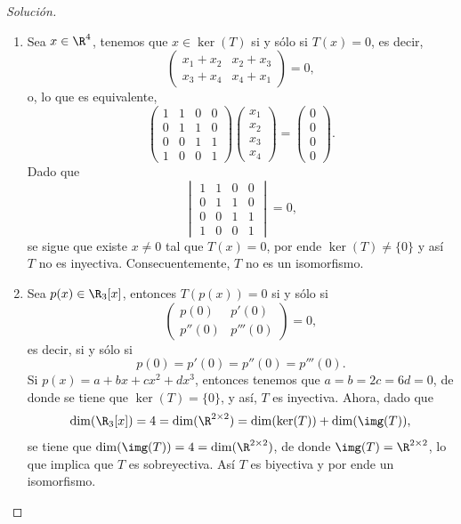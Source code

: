 \documentclass[a4,11pt]{aleph-notas}
\begin{document}
\begin{proof}[Solución]\hspace{0pt}
    \begin{enumerate}
        \item Sea $x\in\R^4$, tenemos que $x\in\ker(T)$ si y sólo si $T(x)=0$, es decir,
        \[
            \begin{pmatrix}
            x_1 + x_2 & x_2 + x_3\\
            x_3 + x_4 & x_4 + x_1
            \end{pmatrix} = 0,
        \]
        o, lo que es equivalente,
        \[
            \begin{pmatrix}
            1 & 1 & 0 & 0\\
            0 & 1 & 1 & 0\\
            0 & 0 & 1 & 1\\
            1 & 0 & 0 & 1 
            \end{pmatrix} \begin{pmatrix}
            x_1 \\ x_2 \\ x_3 \\ x_4
            \end{pmatrix} = \begin{pmatrix}
            0 \\ 0 \\ 0 \\ 0
            \end{pmatrix}.
        \]
        Dado que
        \[
            \begin{vmatrix}
            1 & 1 & 0 & 0\\
            0 & 1 & 1 & 0\\
            0 & 0 & 1 & 1\\
            1 & 0 & 0 & 1 
            \end{vmatrix} = 0,
        \]
        se sigue que existe $x\neq 0$ tal que $T(x) = 0$, por ende $\ker(T)\neq \{0\}$ y así $T$ no es inyectiva. Consecuentemente, $T$ no es un isomorfismo.
        
        \item Sea $p(x)\in\R_3[x]$, entonces $T(p(x))= 0$ si y sólo si
        \[
            \begin{pmatrix}
        p(0) & p'(0) \\
        p''(0) & p'''(0)
        \end{pmatrix} = 0,
        \]
        es decir, si y sólo si 
        \[
            p(0) = p'(0) = p''(0) = p'''(0).
        \]
        Si $p(x) = a + bx + cx^2 + dx^3$, entonces tenemos que $a = b = 2c = 6d = 0$, de donde se tiene que $\ker(T)=\{0\}$, y así, $T$ es inyectiva. Ahora, dado que
        \[
           \dim(\R_3[x]) = 4 = \dim(\R^{2\times 2}) = \dim(\ker(T)) + \dim(\img(T)),
        \]
        se tiene que $\dim(\img(T)) = 4 = \dim(\R^{2\times 2})$, de donde $\img(T)=\R^{2\times 2}$, lo que implica que $T$ es sobreyectiva. Así $T$ es biyectiva y por ende un isomorfismo.
        

\end{enumerate}
\end{proof}
\end{document}
